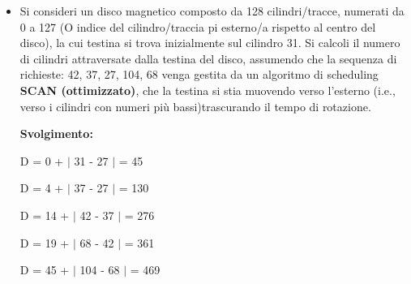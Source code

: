 \documentclass{article}
\begin{document}
\begin{itemize}
    \item Si consideri un disco magnetico composto da 128 cilindri/tracce, numerati da 0 a 127 (O indice del cilindro/traccia pi esterno/a rispetto al centro del disco), la cui testina si trova inizialmente sul cilindro 31. Si calcoli il numero di cilindri attraversate dalla testina del disco, assumendo che la sequenza di richieste: 42, 37, 27, 104, 68 venga gestita da un algoritmo di scheduling \textbf{SCAN (ottimizzato)}, che la testina si stia muovendo verso l'esterno (i.e., verso i cilindri con numeri più bassi)trascurando il tempo di rotazione.\par
    \textbf{Svolgimento:}\par
    \begin{center}    
        D = 0 + $|$ 31 - 27 $|$   = 45\par
        D = 4 + $|$ 37 - 27 $|$  = 130 \par
        D = 14 + $|$ 42 - 37 $|$ = 276 \par
        D = 19 + $|$ 68 - 42 $|$ = 361\par
        D = 45 + $|$ 104 - 68 $|$ = 469 \par
    \end{center}
    \pagebreak
    

\end{itemize}
\end{document}
